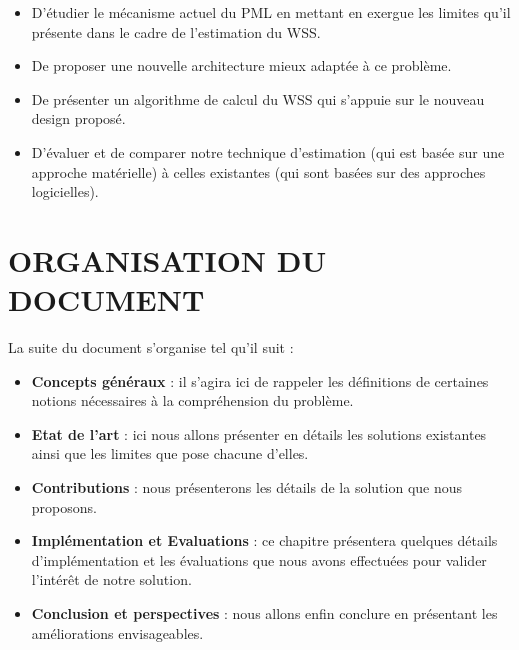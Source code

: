 \begin{itemize}[label=, font=\large \color{darkorange}]
    \item D'étudier le mécanisme actuel du PML en mettant en exergue les limites qu'il présente dans le cadre de l'estimation du WSS.
    \item De proposer une nouvelle architecture mieux adaptée à ce problème.
    \item De présenter un algorithme de calcul du WSS qui s'appuie sur le nouveau design proposé.
    \item D'évaluer et de comparer notre technique d'estimation (qui est basée sur une approche matérielle) à celles existantes (qui sont basées sur des approches logicielles).
\end{itemize}

\section*{ORGANISATION DU DOCUMENT}
La suite du document s'organise tel qu'il suit : 
\begin{itemize}[label=, font=\large \color{darkorange}]
    \item \textbf{Concepts généraux} : il s'agira ici de rappeler les définitions de certaines notions nécessaires à la compréhension du problème.
    \item \textbf{Etat de l'art} : ici nous allons présenter en détails les solutions existantes ainsi que les limites que pose chacune d'elles.
    \item \textbf{Contributions} : nous présenterons les détails de la solution que nous proposons.
    \item \textbf{Implémentation et Evaluations} : ce chapitre présentera quelques détails d’implémentation et les évaluations que nous avons effectuées pour valider l’intérêt de notre solution.
    \item \textbf{Conclusion et perspectives} : nous allons enfin conclure en présentant les améliorations envisageables.
\end{itemize}

